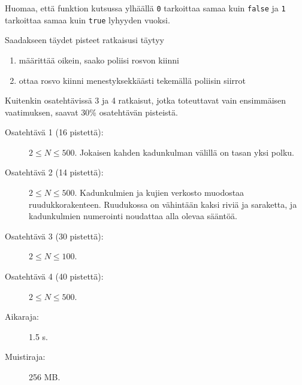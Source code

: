 \documentclass{boi2014-fi}
\newcommand{\constant}[1]{{\tt #1}}
\begin{document}
    Huomaa, että funktion  kutsussa ylhäällä
    \constant{0} tarkoittaa samaa kuin \constant{false} ja
    \constant{1} tarkoittaa samaa kuin \constant{true} lyhyyden vuoksi.

    \Scoring
    Saadakseen täydet pisteet ratkaisusi täytyy
    \begin{enumerate}
        \item määrittää oikein, saako poliisi rosvon kiinni
    \item ottaa rosvo kiinni menestyksekkäästi tekemällä
              poliisin siirrot
    \end{enumerate}
    
    Kuitenkin osatehtävissä 3 ja 4 ratkaisut,
    jotka toteuttavat vain ensimmäisen vaatimuksen,
    saavat 30\% osatehtävän pisteistä.

    \begin{description}
        \item[Osatehtävä 1 (16 pistettä):] $2 \le N \le 500$.
        Jokaisen kahden kadunkulman välillä on tasan yksi polku.        
        \item[Osatehtävä 2 (14 pistettä):] $2 \le N \le 500$. Kadunkulmien ja
        kujien verkosto muodostaa ruudukkorakenteen. Ruudukossa on vähintään
        kaksi riviä ja saraketta, ja kadunkulmien numerointi noudattaa
        alla olevaa sääntöä.
        \begin{figure}[h!]
           \centering
        \end{figure}
        \item[Osatehtävä 3 (30 pistettä):] $2 \le N \le 100$.
        \item[Osatehtävä 4 (40 pistettä):] $2 \le N \le 500$.
    \end{description}

    \Constraints
    
    \begin{description}
        \item[Aikaraja:] 1.5 s.
        \item[Muistiraja:] 256 MB.
    \end{description}
\end{document}
